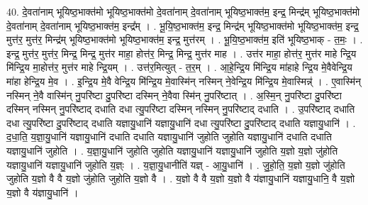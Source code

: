 \documentclass[17pt]{extarticle}
\begin{document}
40. दे॒वता॑नाम् भूयिष्ठ॒भाक्त॑मो भूयिष्ठ॒भाक्त॑मो दे॒वता॑नाम् दे॒वता॑नाम् भूयिष्ठ॒भाक्त॑म॒ इन्द्र॒ मिन्द्र॑म् भूयिष्ठ॒भाक्त॑मो दे॒वता॑नाम् दे॒वता॑नाम् भूयिष्ठ॒भाक्त॑म॒ इन्द्र᳚म् । . भू॒यि॒ष्ठ॒भाक्त॑म॒ इन्द्र॒ मिन्द्र॑म् भूयिष्ठ॒भाक्त॑मो भूयिष्ठ॒भाक्त॑म॒ इन्द्र॒ मुत्त॑र॒ मुत्त॑र॒ मिन्द्र॑म् भूयिष्ठ॒भाक्त॑मो भूयिष्ठ॒भाक्त॑म॒ इन्द्र॒ मुत्त॑रम् । . भू॒यि॒ष्ठ॒भाक्त॑म॒ इति॑ भूयिष्ठ॒भाक् - त॒मः॒ । . इन्द्र॒ मुत्त॑र॒ मुत्त॑र॒ मिन्द्र॒ मिन्द्र॒ मुत्त॑र माहा॒ होत्त॑र॒ मिन्द्र॒ मिन्द्र॒ मुत्त॑र माह । . उत्त॑र माहा॒ होत्त॑र॒ मुत्त॑र माहे न्द्रि॒य मि॑न्द्रि॒य मा॒होत्त॑र॒ मुत्त॑र माहे न्द्रि॒यम् । . उत्त॑र॒मित्युत् - त॒र॒म् । . आ॒हे॒न्द्रि॒य मि॑न्द्रि॒य मा॑हाहे न्द्रि॒य मे॒वैवेन्द्रि॒य मा॑हा हेन्द्रि॒य मे॒व । . इ॒न्द्रि॒य मे॒वै वेन्द्रि॒य मि॑न्द्रि॒य मे॒वास्मि॑न् नस्मिन् ने॒वेन्द्रि॒य मि॑न्द्रि॒य मे॒वास्मिन्न्॑ । . ए॒वास्मि॑न् नस्मिन् ने॒वै वास्मि॑न् नु॒परि॑ष्टा दु॒परि॑ष्टा दस्मिन् ने॒वैवा स्मि॑न् नु॒परि॑ष्टात् । . अ॒स्मि॒न् नु॒परि॑ष्टा दु॒परि॑ष्टा दस्मिन् नस्मिन् नु॒परि॑ष्टाद् दधाति दधा त्यु॒परि॑ष्टा दस्मिन् नस्मिन् नु॒परि॑ष्टाद् दधाति । . उ॒परि॑ष्टाद् दधाति दधा त्यु॒परि॑ष्टा दु॒परि॑ष्टाद् दधाति यज्ञायु॒धानि॑ यज्ञायु॒धानि॑ दधा त्यु॒परि॑ष्टा दु॒परि॑ष्टाद् दधाति यज्ञायु॒धानि॑ । . द॒धा॒ति॒ य॒ज्ञा॒यु॒धानि॑ यज्ञायु॒धानि॑ दधाति दधाति यज्ञायु॒धानि॑ जुहोति जुहोति यज्ञायु॒धानि॑ दधाति दधाति यज्ञायु॒धानि॑ जुहोति । . य॒ज्ञा॒यु॒धानि॑ जुहोति जुहोति यज्ञायु॒धानि॑ यज्ञायु॒धानि॑ जुहोति य॒ज्ञो य॒ज्ञो जु॑होति यज्ञायु॒धानि॑ यज्ञायु॒धानि॑ जुहोति य॒ज्ञ्ः । . य॒ज्ञा॒यु॒धानीति॑ यज्ञ् - आ॒यु॒धानि॑ । . जु॒हो॒ति॒ य॒ज्ञो य॒ज्ञो जु॑होति जुहोति य॒ज्ञो वै वै य॒ज्ञो जु॑होति जुहोति य॒ज्ञो वै । . य॒ज्ञो वै वै य॒ज्ञो य॒ज्ञो वै य॑ज्ञायु॒धानि॑ यज्ञायु॒धानि॒ वै य॒ज्ञो य॒ज्ञो वै य॑ज्ञायु॒धानि॑ । \newline
\pagebreak
{}
\end{document}
